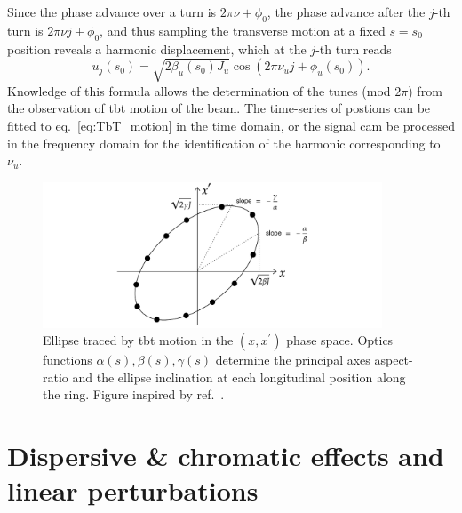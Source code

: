  Since the phase advance over a turn is $2\pi \nu+\phi_0$, the phase advance after the $j$-th turn is $2\pi\nu j+\phi_0$, and thus
 sampling the transverse motion at a fixed $s=s_0$ position reveals a harmonic displacement, which at the $j$-th turn reads
\begin{equation}
    u_j(s_0)=\sqrt{2\beta_u(s_0) J_u}\cos(2\pi\nu_u j+\phi_u(s_0)).
    \label{eq:TbT_motion}
\end{equation}
Knowledge of this formula allows the determination of the tunes (mod $2\pi$) from the observation of \gls*{tbt} motion of the beam. The time-series of postions can be fitted to eq.~\eqref{eq:TbT_motion} in the time domain, or the signal cam be processed in the frequency domain for the identification of the harmonic corresponding to $\nu_u$.
\begin{figure}[htb]
    \centering
    \includegraphics[width=0.9\textwidth]{Images/ellipse.pdf}
    \caption[Ellipse traced by TbT motion in the $(x,x^\prime)$ phase space.]{Ellipse traced by \gls*{tbt} motion in the $(x,x^\prime)$ phase space. Optics functions $\alpha(s), \beta(s), \gamma(s)$ determine the principal axes aspect-ratio and the ellipse inclination at each longitudinal position along the ring. Figure inspired by ref.~\cite{wolski_beam_2014}.}
    \label{fig:ellipse}
\end{figure}
\section{Dispersive \& chromatic effects and linear perturbations}
